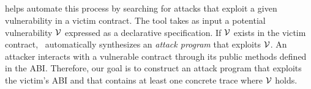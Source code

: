 


\subsection{\toolname}
\vspace{-0.04in}
\toolname helps automate this process by searching for attacks that exploit a
given vulnerability in a victim contract. The tool takes as input a potential
vulnerability $\mathcal{V}$ expressed as a declarative specification. If
$\mathcal{V}$ exists in the victim contract, \toolname\ automatically
synthesizes an \emph{attack program} that exploits $\mathcal{V}$. An attacker
interacts with a vulnerable contract through its public methods defined in the
ABI. Therefore, our goal is to construct an attack program that exploits the
victim's ABI and that contains at least one concrete trace where
$\mathcal{V}$ holds. 

